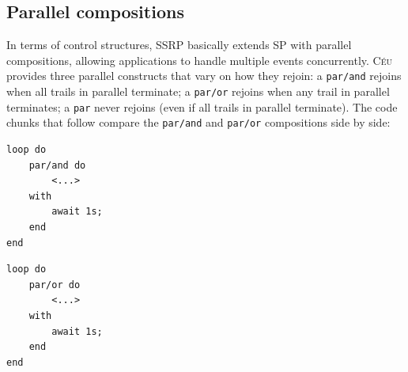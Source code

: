 \documentclass{sigplanconf}
\newcommand{\CEU}{\textsc{C\'{e}u}\xspace}
\newcommand{\code}[1] {{\small{\texttt{#1}}}}
\newcommand{\1}{\;}
\newcommand{\2}{\;\;}
\newcommand{\3}{\;\;\;}
\newcommand{\5}{\;\;\;\;\;}
\begin{document}

%



\subsection{Parallel compositions}
\label{sec.ceu.par}

In terms of control structures, SSRP basically extends SP with parallel 
compositions, allowing applications to handle multiple events concurrently.
%
\CEU provides three parallel constructs that vary on how they rejoin:
a \code{par/and} rejoins when all trails in parallel terminate;
a \code{par/or} rejoins when any trail in parallel terminates;
a \code{par} never rejoins (even if all trails in parallel terminate).
%
The code chunks that follow compare the \code{par/and} and \code{par/or} 
compositions side by side:

\begin{minipage}[t]{0.40\linewidth}
\begin{lstlisting}
loop do
    par/and do
        <...>
    with
        await 1s;
    end
end
\end{lstlisting}
\end{minipage}
%
\begin{minipage}[t]{0.40\linewidth}
\begin{lstlisting}
loop do
    par/or do
        <...>
    with
        await 1s;
    end
end
\end{lstlisting}
\end{minipage}
\end{document}
